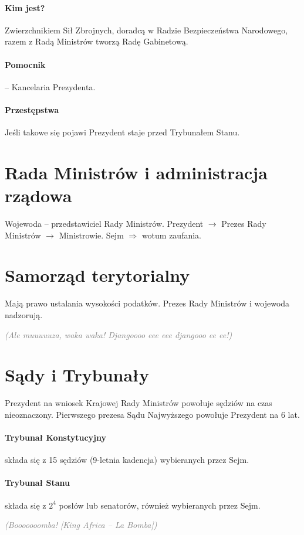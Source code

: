 \documentclass [a4paper, 12pt, oneside]{article}
\newcommand{\comment}[1]{\textcolor{Gray}{\textsf{\emph{(#1)}}}}
\begin{document}
    \paragraph{Kim jest?} Zwierzchnikiem Sił Zbrojnych, doradcą w Radzie Bezpieczeństwa Narodowego, razem z Radą Ministrów tworzą Radę Gabinetową.

    \paragraph{Pomocnik} -- Kancelaria Prezydenta.

    \paragraph{Przestępstwa} Jeśli takowe się pojawi Prezydent staje przed Trybunałem Stanu.

\section{Rada Ministrów i administracja rządowa} %
\label{sec:rada_ministr_w_i_administracja_rz_dowa}
    Wojewoda -- przedstawiciel Rady Ministrów. Prezydent $\rightarrow$ Prezes Rady Ministrów $\rightarrow$ Ministrowie. Sejm $\Rightarrow$ wotum zaufania.

\section{Samorząd terytorialny} %
\label{sec:samorz_d_terytorialny}
    Mają prawo ustalania wysokości podatków. Prezes Rady Ministrów i wojewoda nadzorują.

\comment{Ale muuuuuza, waka waka! Djangoooo eee eee djangooo ee ee!}

\section{Sądy i Trybunały} %
\label{sec:s_dy_i_trybuna_y}
    Prezydent na wniosek Krajowej Rady Ministrów powołuje sędziów na czas nieoznaczony. Pierwszego prezesa Sądu Najwyższego powołuje Prezydent na 6 lat.

    \paragraph{Trybunał Konstytucyjny} składa się z 15 sędziów (9-letnia kadencja) wybieranych przez Sejm.

    \paragraph{Trybunał Stanu} składa się z $2^4$ posłów lub senatorów, również wybieranych przez Sejm.

\comment{Booooooomba! [King Africa -- La Bomba]}
\end{document}
